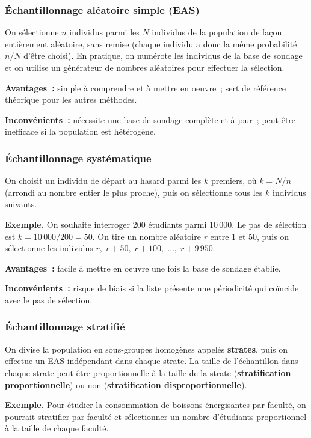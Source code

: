 \documentclass[11pt,french]{article}
\begin{document}
\subsubsection{Échantillonnage aléatoire simple (EAS)}

On sélectionne $n$ individus parmi les $N$ individus de la population de façon entièrement
aléatoire, sans remise (chaque individu a donc la même probabilité $n/N$ d'être choisi). En
pratique, on numérote les individus de la base de sondage et on utilise un générateur de
nombres aléatoires pour effectuer la sélection.

\textbf{Avantages~:} simple à comprendre et à mettre en oeuvre~; sert de référence théorique
pour les autres méthodes.

\textbf{Inconvénients~:} nécessite une base de sondage complète et à jour~; peut être
inefficace si la population est hétérogène.

\subsubsection{Échantillonnage systématique}

On choisit un individu de départ au hasard parmi les $k$ premiers, où $k = N/n$ (arrondi au
nombre entier le plus proche), puis on sélectionne tous les $k$\ieme{} individus suivants.

\textbf{Exemple.} On souhaite interroger 200 étudiants parmi 10\,000. Le pas de sélection est
$k = 10\,000/200 = 50$. On tire un nombre aléatoire $r$ entre 1 et 50, puis on sélectionne les
individus $r,\; r+50,\; r+100,\; \ldots,\; r+9\,950$.

\textbf{Avantages~:} facile à mettre en oeuvre une fois la base de sondage établie.

\textbf{Inconvénients~:} risque de biais si la liste présente une périodicité qui coïncide
avec le pas de sélection.

\subsubsection{Échantillonnage stratifié}

On divise la population en sous-groupes homogènes appelés \textbf{strates}, puis on effectue
un EAS indépendant dans chaque strate. La taille de l'échantillon dans chaque strate peut
être proportionnelle à la taille de la strate (\textbf{stratification proportionnelle}) ou
non (\textbf{stratification disproportionnelle}).

\textbf{Exemple.} Pour étudier la consommation de boissons énergisantes par faculté, on
pourrait stratifier par faculté et sélectionner un nombre d'étudiants proportionnel à la
taille de chaque faculté.
\end{document}
